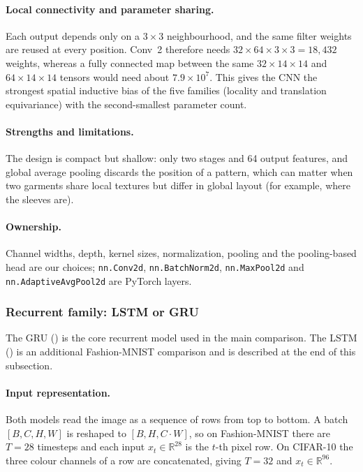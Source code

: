 \paragraph{Local connectivity and parameter sharing.} Each output depends only on
a $3\times3$ neighbourhood, and the same filter weights are reused at every
position. Conv~2 therefore needs $32\times64\times3\times3=18{,}432$ weights,
whereas a fully connected map between the same $32\times14\times14$ and
$64\times14\times14$ tensors would need about $7.9\times10^{7}$. This gives the
CNN the strongest spatial inductive bias of the five families (locality and
translation equivariance) with the second-smallest parameter count.

\paragraph{Strengths and limitations.} The design is compact but shallow: only two stages and 64
output features, and global average pooling discards the position of a pattern,
which can matter when two garments share local textures but differ in global
layout (for example, where the sleeves are).

\paragraph{Ownership.} Channel widths, depth, kernel sizes, normalization,
pooling and the pooling-based head are our choices; \texttt{nn.Conv2d},
\texttt{nn.BatchNorm2d}, \texttt{nn.MaxPool2d} and
\texttt{nn.AdaptiveAvgPool2d} are PyTorch layers.

\subsubsection{Recurrent family: LSTM or GRU}
The GRU () is the core recurrent model used in the
main comparison. The LSTM () is an additional
Fashion-MNIST comparison and is described at the end of this subsection.

\paragraph{Input representation.} Both models read the image as a sequence of
rows from top to bottom. A batch $[B,C,H,W]$ is reshaped to $[B,H,C\cdot W]$, so
on Fashion-MNIST there are $T=28$ timesteps and each input
$x_t\in\mathbb{R}^{28}$ is the $t$-th pixel row. On CIFAR-10 the three colour
channels of a row are concatenated, giving $T=32$ and $x_t\in\mathbb{R}^{96}$.

